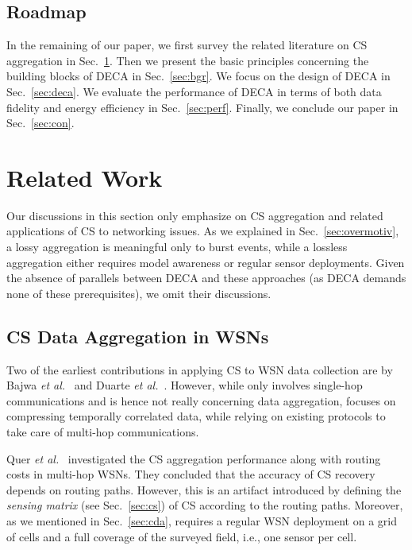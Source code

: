 \documentclass[conference]{IEEEtran}
\begin{document}
  \subsection{Roadmap}
In the remaining of our paper, we first survey the related literature on CS aggregation in Sec.~\ref{sec:related}. Then we present the basic principles concerning the building blocks of DECA in Sec.~\ref{sec:bgr}. We focus on the design of DECA in Sec.~\ref{sec:deca}. We evaluate the performance of DECA in terms of both data fidelity and energy efficiency in Sec.~\ref{sec:perf}. Finally, we conclude our paper in Sec.~\ref{sec:con}.


\section{Related Work} \label{sec:related}
Our discussions in this section only emphasize on CS aggregation and related applications of CS to networking issues. As we explained in Sec.~\ref{sec:overmotiv}, a lossy aggregation is meaningful only to burst events, while a lossless aggregation either requires model awareness or regular sensor deployments. Given the absence of parallels between DECA and these approaches (as DECA demands none of these prerequisites), we omit their discussions.

  \subsection{CS Data Aggregation in WSNs}
Two of the earliest contributions in applying CS to WSN data collection are by Bajwa \textit{et al.}\ \cite{BajwaHSN-IPSN06} and Duarte \textit{et al.}\ \cite{DuarteWBB-IPSN06}. However, while \cite{BajwaHSN-IPSN06} only involves single-hop communications and is hence not really concerning data aggregation, \cite{DuarteWBB-IPSN06} focuses on compressing temporally correlated data, while relying on existing protocols to take care of multi-hop communications.

    Quer \textit{et al.}\ \cite{QuerMMRWZ-ITA09} investigated the CS aggregation performance along with routing costs in multi-hop WSNs. They concluded that the accuracy of CS recovery depends on routing paths. However, this is an artifact introduced by defining the \textit{sensing matrix} (see Sec.~\ref{sec:cs}) of CS according to the routing paths. Moreover, as we mentioned in Sec.~\ref{sec:cda}, \cite{QuerMMRWZ-ITA09} requires a regular WSN deployment on a grid of cells and a full coverage of the surveyed field, i.e., one sensor per cell.
\end{document}
